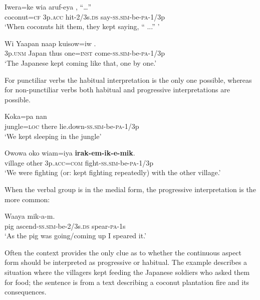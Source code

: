 \ea%
\label{ex:3:x350}
\gll Iwera=ke wia aruf-eya , ``{\dots''} \\
coconut=\textsc{cf} 3p.\textsc{acc} hit-2/3s.\textsc{ds} say-\textsc{ss}.\textsc{sim}-be-\textsc{pa}-1/3p \\
\glt`When coconuts hit them, they kept saying, `` ...'' '
\z

\ea%
\label{ex:3:x1045}
\gll Wi Yaapan naap kuisow=iw . \\
3p.\textsc{unm} Japan thus one=\textsc{inst} come-\textsc{ss}.\textsc{sim}-be-\textsc{pa}-1/3p\\
\glt`The Japanese kept coming like that, one by one.'
\z

For punctiliar verbs the habitual interpretation  is the only one possible, whereas for non-punctiliar verbs both habitual and progressive interpretations are possible.

\ea%
\label{ex:3:x351}
\gll Koka=pa nan  \\
jungle=\textsc{loc} there lie.down-\textsc{ss}.\textsc{sim}-be-\textsc{pa}-1/3p\\
\glt`We kept sleeping in the jungle'
\z

\ea%
\label{ex:3:x1932}
\gll Owowa oko wiam=iya \textbf{irak-em-ik-e-mik}. \\
village other 3p.\textsc{acc}=\textsc{com} fight-\textsc{ss}.\textsc{sim}-be-\textsc{pa}-1/3p\\
\glt`We were fighting (or: kept fighting repeatedly) with the other village.'
\z

 When the verbal group is in the medial form, the progressive interpretation  is the more common:

\ea%
\label{ex:3:x353}
\gll Waaya   mik-a-m. \\
pig ascend-\textsc{ss}.\textsc{sim}-be-2/3s.\textsc{ds} spear-\textsc{pa}-1s\\
\glt`As the pig was going/coming up I speared it.'
\z

Often the context provides the only clue as to whether the continuous aspect form should be interpreted as progressive or habitual. The example  describes a situation where the villagers kept feeding the Japanese soldiers who asked them for food; the sentence  is from a text describing a coconut plantation fire and its consequences.

